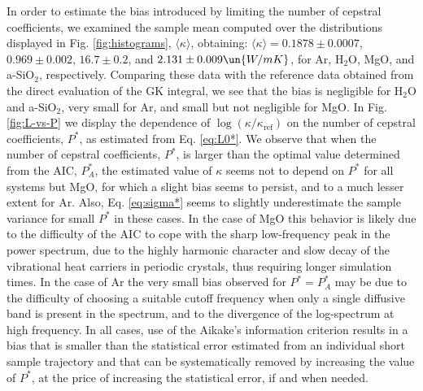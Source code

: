 In order to estimate the bias introduced by limiting the number of cepstral coefficients, we examined the sample mean computed over the distributions displayed in Fig. \ref{fig:histograms}, $\langle\kappa\rangle$, obtaining: $\langle\kappa\rangle = 0.1878 \pm 0.0007$, $0.969 \pm 0.002$, $16.7 \pm 0.2$, and $2.131 \pm 0.009 \un{W/mK}$, for Ar, H$_2$O, MgO, and a-SiO$_2$, respectively. Comparing these data with the reference data obtained from  the direct evaluation of the GK integral, we see that the bias is negligible for H$_2$O and a-SiO$_2$, very small for Ar, and small but not negligible for MgO. In Fig. \ref{fig:L-vs-P} we display the dependence of $\log(\kappa/\kappa_{\mathrm{ref}})$ on the number of cepstral coefficients, $P^*$, as estimated from Eq. \eqref{eq:L0*}. We observe that when the number of cepstral coefficients, $P^*$, is larger than the optimal value determined from the AIC, $P_A^*$, the estimated value of $\kappa$ seems not to depend on $P^*$ for all systems but MgO, for which a slight bias seems to persist, and to a much lesser extent for Ar. Also, Eq. \eqref{eq:sigma*} seems to slightly underestimate the sample variance for small $P^*$ in these cases. In the case of MgO this behavior is likely due to the difficulty of the AIC to cope with the sharp low-frequency peak in the power spectrum, due to the highly harmonic character and slow decay of the vibrational heat carriers in periodic crystals,\cite{Carbogno2017} thus requiring longer simulation times. In the case of Ar the very small bias observed for $P^* =P^*_A$ may be due to the difficulty of choosing a suitable cutoff frequency when only a single diffusive band is present in the spectrum, and to the divergence of the log-spectrum at high frequency. In all cases, use of the Aikake's information criterion results in a bias that is smaller than the statistical error estimated from an individual short sample trajectory and that can be systematically removed by increasing the value of $P^*$, at the price of increasing the statistical error, if and when needed.

